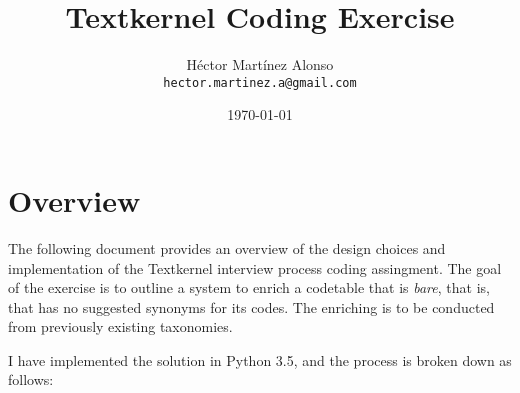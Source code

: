 \documentclass[12pt]{article}%
\begin{document}
\title{Textkernel Coding Exercise}
\author{Héctor Martínez Alonso\\ \texttt{hector.martinez.a@gmail.com}}
\date{\today}
\maketitle
\section{Overview}

The following document provides an overview of the design choices and implementation of the Textkernel interview process coding assingment. The goal of the exercise is to outline a system to enrich a codetable that is \textit{bare}, that is, that has no suggested synonyms for its codes. The enriching is to be conducted from previously existing taxonomies.

I have implemented the solution in Python 3.5, and the process is broken down as follows:
\end{document}
